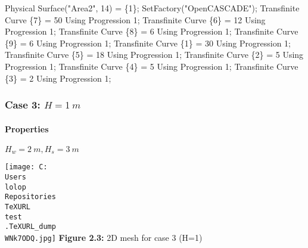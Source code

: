 \documentclass[11pt]{article}
\newenvironment{Shaded}{}{}
\newcommand{\DecValTok}[1]{\textcolor[rgb]{0.25,0.63,0.44}{{#1}}}
\newcommand{\StringTok}[1]{\textcolor[rgb]{0.25,0.44,0.63}{{#1}}}
\newcommand{\NormalTok}[1]{{#1}}
\newcommand{\OperatorTok}[1]{\textcolor[rgb]{0.40,0.40,0.40}{{#1}}}
\begin{document}
\begin{Shaded}
\begin{Highlighting}[]
\NormalTok{Physical Surface}\OperatorTok{(}\StringTok{"Area2"}\OperatorTok{,} \DecValTok{14}\OperatorTok{)} \OperatorTok{=} \OperatorTok{\{}\DecValTok{1}\OperatorTok{\};}
\NormalTok{SetFactory}\OperatorTok{(}\StringTok{"OpenCASCADE"}\OperatorTok{);}
\NormalTok{Transfinite Curve }\OperatorTok{\{}\DecValTok{7}\OperatorTok{\}} \OperatorTok{=} \DecValTok{50}\NormalTok{ Using Progression }\DecValTok{1}\OperatorTok{;}
\NormalTok{Transfinite Curve }\OperatorTok{\{}\DecValTok{6}\OperatorTok{\}} \OperatorTok{=} \DecValTok{12}\NormalTok{ Using Progression }\DecValTok{1}\OperatorTok{;}
\NormalTok{Transfinite Curve }\OperatorTok{\{}\DecValTok{8}\OperatorTok{\}} \OperatorTok{=} \DecValTok{6}\NormalTok{ Using Progression }\DecValTok{1}\OperatorTok{;}
\NormalTok{Transfinite Curve }\OperatorTok{\{}\DecValTok{9}\OperatorTok{\}} \OperatorTok{=} \DecValTok{6}\NormalTok{ Using Progression }\DecValTok{1}\OperatorTok{;}
\NormalTok{Transfinite Curve }\OperatorTok{\{}\DecValTok{1}\OperatorTok{\}} \OperatorTok{=} \DecValTok{30}\NormalTok{ Using Progression }\DecValTok{1}\OperatorTok{;}
\NormalTok{Transfinite Curve }\OperatorTok{\{}\DecValTok{5}\OperatorTok{\}} \OperatorTok{=} \DecValTok{18}\NormalTok{ Using Progression }\DecValTok{1}\OperatorTok{;}
\NormalTok{Transfinite Curve }\OperatorTok{\{}\DecValTok{2}\OperatorTok{\}} \OperatorTok{=} \DecValTok{5}\NormalTok{ Using Progression }\DecValTok{1}\OperatorTok{;}
\NormalTok{Transfinite Curve }\OperatorTok{\{}\DecValTok{4}\OperatorTok{\}} \OperatorTok{=} \DecValTok{5}\NormalTok{ Using Progression }\DecValTok{1}\OperatorTok{;}
\NormalTok{Transfinite Curve }\OperatorTok{\{}\DecValTok{3}\OperatorTok{\}} \OperatorTok{=} \DecValTok{2}\NormalTok{ Using Progression }\DecValTok{1}\OperatorTok{;}
\end{Highlighting}
\end{Shaded}

\hypertarget{case-3-h-1-m}{%
\subsubsection{\texorpdfstring{Case 3:
\(H = 1\ m\)}{Case 3: H = 1\textbackslash{} m}}\label{case-3-h-1-m}}

\hypertarget{properties-3}{%
\paragraph{Properties}\label{properties-3}}

\(H_w = 2\ m, H_s = 3\ m\)

\texttt{[image: C:\\Users\\lolop\\Repositories\\TeXURL\\test\\.TeXURL\_dump\\WNk7ODQ.jpg]} \textbf{Figure 2.3:}
2D mesh for case 3 (H=1)
\end{document}
